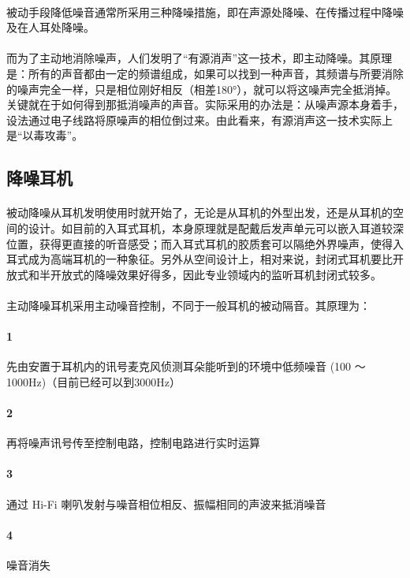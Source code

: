 \documentclass{ctexart}
\begin{document}
\paragraph{}
被动手段降低噪音通常所采用三种降噪措施，即在声源处降噪、在传播过程中降噪及在人耳处降噪。
\paragraph{}
而为了主动地消除噪声，人们发明了“有源消声”这一技术，即主动降噪。其原理是：所有的声音都由一定的频谱组成，如果可以找到一种声音，其频谱与所要消除的噪声完全一样，只是相位刚好相反（相差180°），就可以将这噪声完全抵消掉。关键就在于如何得到那抵消噪声的声音。实际采用的办法是：从噪声源本身着手，设法通过电子线路将原噪声的相位倒过来。由此看来，有源消声这一技术实际上是“以毒攻毒”。 
\subsection{降噪耳机}
\paragraph{}
被动降噪从耳机发明使用时就开始了，无论是从耳机的外型出发，还是从耳机的空间的设计。如目前的入耳式耳机，本身原理就是配戴后发声单元可以嵌入耳道较深位置，获得更直接的听音感受；而入耳式耳机的胶质套可以隔绝外界噪声，使得入耳式成为高端耳机的一种象征。另外从空间设计上，相对来说，封闭式耳机要比开放式和半开放式的降噪效果好得多，因此专业领域内的监听耳机封闭式较多。
\paragraph{}
主动降噪耳机采用主动噪音控制，不同于一般耳机的被动隔音。其原理为：
\paragraph{1}
先由安置于耳机内的讯号麦克风侦测耳朵能听到的环境中低频噪音 (100 ～ 1000Hz)（目前已经可以到3000Hz）
\paragraph{2}
再将噪声讯号传至控制电路，控制电路进行实时运算
\paragraph{3}
通过 Hi-Fi 喇叭发射与噪音相位相反、振幅相同的声波来抵消噪音
\paragraph{4}
噪音消失
\end{document}
